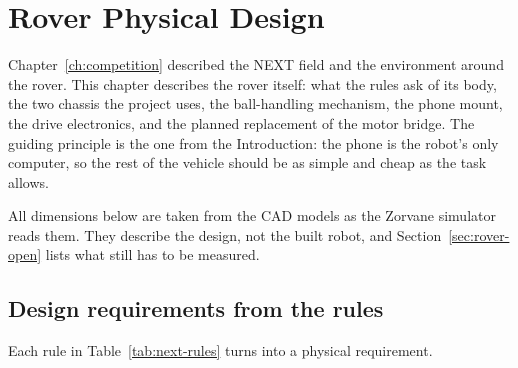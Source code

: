 
\chapter{Rover Physical Design}
\label{ch:rover}

Chapter~\ref{ch:competition} described the NEXT field and the environment around the rover.
This chapter describes the rover itself: what the rules ask of its body, the two chassis the project uses, the ball-handling mechanism, the phone mount, the drive electronics, and the planned replacement of the motor bridge.
The guiding principle is the one from the Introduction: the phone is the robot's only computer, so the rest of the vehicle should be as simple and cheap as the task allows.

All dimensions below are taken from the CAD models as the Zorvane simulator reads them.
They describe the design, not the built robot, and Section~\ref{sec:rover-open} lists what still has to be measured.

\section{Design requirements from the rules}
\label{sec:rover-requirements}

Each rule in Table~\ref{tab:next-rules} turns into a physical requirement.

